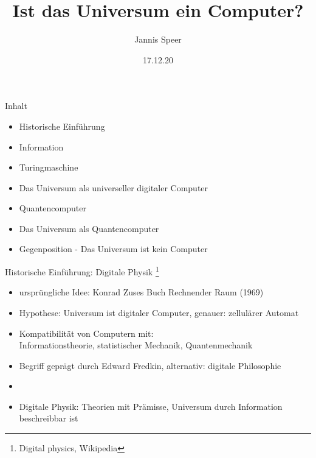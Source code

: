 \documentclass[aspectratio=1610, 9pt]{beamer}
\title{Ist das Universum ein Computer?}
\author[J.~Speer]{Jannis Speer}
\date{17.12.20}
\institute{Big Questions Seminar}
\begin{document}
\maketitle

\begin{frame}{Inhalt}
  \begin{itemize}
    \item Historische Einführung
    \item Information
    \item Turingmaschine
    \item Das Universum als universeller digitaler Computer
    \item Quantencomputer
    \item Das Universum als Quantencomputer
    \item Gegenposition - Das Universum ist kein Computer
  \end{itemize}
\end{frame}


\begin{frame}{Historische Einführung: Digitale Physik \footnote[1]{Digital physics, Wikipedia}}
  \begin{itemize}
    \item ursprüngliche Idee: Konrad Zuses Buch Rechnender Raum (1969)
    \item Hypothese: Universum ist digitaler Computer, genauer: zellulärer Automat
    \item Kompatibilität von Computern mit: \\Informationstheorie, statistischer Mechanik, Quantenmechanik
    \item Begriff geprägt durch  Edward Fredkin, alternativ: digitale Philosophie
    \item[]
    \item[\rightarrow] Digitale Physik: Theorien mit Prämisse, Universum durch Information beschreibbar ist
  \end{itemize}
\end{frame}
\end{document}
